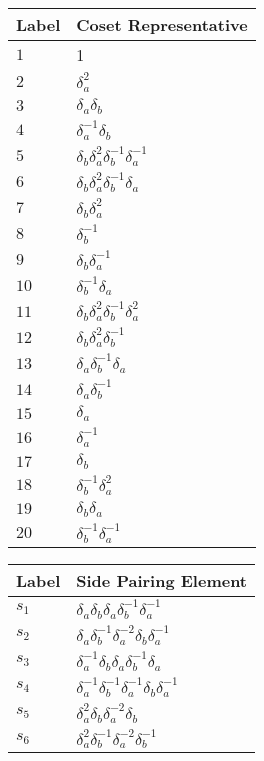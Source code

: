 \documentclass{article}
\begin{document}
\begin{center}
\begin{tabular}{ll}
\toprule
Label & Coset Representative\\
\midrule
$1$ & 1 \\
$2$ & $\delta_a^{2}$ \\
$3$ & $\delta_a^{}\delta_b^{}$ \\
$4$ & $\delta_a^{-1}\delta_b^{}$ \\
$5$ & $\delta_b^{}\delta_a^{2}\delta_b^{-1}\delta_a^{-1}$ \\
$6$ & $\delta_b^{}\delta_a^{2}\delta_b^{-1}\delta_a^{}$ \\
$7$ & $\delta_b^{}\delta_a^{2}$ \\
$8$ & $\delta_b^{-1}$ \\
$9$ & $\delta_b^{}\delta_a^{-1}$ \\
$10$ & $\delta_b^{-1}\delta_a^{}$ \\
$11$ & $\delta_b^{}\delta_a^{2}\delta_b^{-1}\delta_a^{2}$ \\
$12$ & $\delta_b^{}\delta_a^{2}\delta_b^{-1}$ \\
$13$ & $\delta_a^{}\delta_b^{-1}\delta_a^{}$ \\
$14$ & $\delta_a^{}\delta_b^{-1}$ \\
$15$ & $\delta_a^{}$ \\
$16$ & $\delta_a^{-1}$ \\
$17$ & $\delta_b^{}$ \\
$18$ & $\delta_b^{-1}\delta_a^{2}$ \\
$19$ & $\delta_b^{}\delta_a^{}$ \\
$20$ & $\delta_b^{-1}\delta_a^{-1}$ \\
\bottomrule
\end{tabular}
\hfill
\begin{tabular}{ll}
\toprule
Label & Side Pairing Element\\
\midrule
$s_{1}$ & $\delta_a^{}\delta_b^{}\delta_a^{}\delta_b^{-1}\delta_a^{-1}$ \\
$s_{2}$ & $\delta_a^{}\delta_b^{-1}\delta_a^{-2}\delta_b^{}\delta_a^{-1}$ \\
$s_{3}$ & $\delta_a^{-1}\delta_b^{}\delta_a^{}\delta_b^{-1}\delta_a^{}$ \\
$s_{4}$ & $\delta_a^{-1}\delta_b^{-1}\delta_a^{-1}\delta_b^{}\delta_a^{-1}$ \\
$s_{5}$ & $\delta_a^{2}\delta_b^{}\delta_a^{-2}\delta_b^{}$ \\
$s_{6}$ & $\delta_a^{2}\delta_b^{-1}\delta_a^{-2}\delta_b^{-1}$ \\

\end{tabular}
\end{center}
\end{document}
